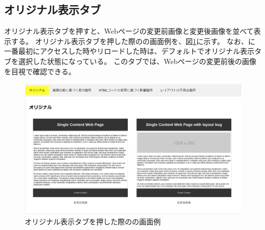 \subsection{オリジナル表示タブ}\label{subsec:original_tab}
オリジナル表示タブを押すと、Webページの変更前画像と変更後画像を並べて表示する。
オリジナル表示タブを押した際の\toolName の画面例を、図\ref{fig: Appearance_original_tab}に示す。
なお、\toolName に一番最初にアクセスした時やリロードした時は、デフォルトでオリジナル表示タブを選択した状態になっている。
このタブでは、Webページの変更前後の画像を目視で確認できる。
\begin{figure}[tp]
    \begin{center}
        \includegraphics[width=1.0\columnwidth]{image/3_original_tab2.png}
        \caption{オリジナル表示タブを押した際の\toolName の画面例}
        \label{fig: Appearance_original_tab}
    \end{center}
\end{figure}

